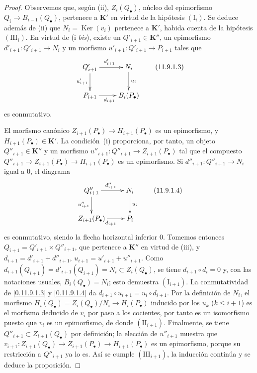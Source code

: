 \begin{proof}
Observemos que, según (ii), $Z_i(Q_\bullet)$, núcleo del epimorfismo $Q_i\to B_{i-1}(Q_\bullet)$, pertenece a $\boldsymbol{K}'$ en virtud de la hipótesis $(\mathrm I_i)$. Se deduce además de (ii) que
$N_i=\operatorname{Ker}(v_i)$
pertenece a $\boldsymbol{K}'$, habida cuenta de la hipótesis $(\mathrm{III}_i)$. En virtud de (i \emph{bis}), existe un $Q'_{i+1}\in\boldsymbol{K}''$, un epimorfismo
$d'_{i+1}:Q'_{i+1}\to N_i$
y un morfismo $u'_{i+1}:Q'_{i+1}\to P_{i+1}$ tales que
\[
\xymatrix{
Q'_{i+1}\ar[r]^{d'_{i+1}}\ar[d]_{u'_{i+1}} &
N_i\ar[d]^{u_i}\\
P_{i+1}\ar[r]_{d_{i+1}} & B_i(P_\bullet)
}
\tag{11.9.1.3}\label{0.11.9.1.3-fr}
\]
es conmutativo.

El morfismo canónico
$Z_{i+1}(P_\bullet)\to H_{i+1}(P_\bullet)$
es un epimorfismo, y $H_{i+1}(P_\bullet)\in\boldsymbol{K}'$.
La condición~(i) proporciona, por tanto, un objeto $Q''_{i+1}\in\boldsymbol{K}''$ y un
morfismo
$u''_{i+1}:Q''_{i+1}\to Z_{i+1}(P_\bullet)$
tal que el compuesto
$Q''_{i+1}\to Z_{i+1}(P_\bullet)\to H_{i+1}(P_\bullet)$
es un epimorfismo.
Si $d''_{i+1}:Q''_{i+1}\to N_i$ igual a $0$, el diagrama
\[
\xymatrix{
Q''_{i+1}\ar[r]^{d''_{i+1}}\ar[d]_{u''_{i+1}} &
N_i\ar[d]^{u_i}\\
Z_{i+1}(P_\bullet)\ar[r]_{d_{i+1}} & P_i
}
\tag{11.9.1.4}\label{0.11.9.1.4-fr}
\]
es conmutativo, siendo la flecha horizontal inferior $0$. Tomemos entonces $Q_{i+1}=Q'_{i+1}\times Q''_{i+1}$, que pertenece a $\boldsymbol{K}''$ en virtud de (iii), y
$d_{i+1}=d'_{i+1}+d''_{i+1}$, $u_{i+1}=u'_{i+1}+u''_{i+1}$.
Como $d_{i+1}(Q_{i+1})=d'_{i+1}(Q_{i+1})=N_i\subset Z_i(Q_\bullet)$, se tiene
$d_{i+1}\circ d_i=0$ y, con las notaciones usuales,
$B_i(Q_\bullet)=N_i$; esto demuestra
$(\mathrm I_{i+1})$.
La conmutatividad de \eqref{0.11.9.1.3} y
\eqref{0.11.9.1.4} da
$d_{i+1}\circ u_{i+1}=u_i\circ d_{i+1}$.
Por la definición de $N_i$, el morfismo
$H_i(Q_\bullet)=Z_i(Q_\bullet)/N_i\to H_i(P_\bullet)$
inducido por los $u_k$ ($k\leq i+1$) es el morfismo deducido de $v_i$ por paso a los cocientes, por tanto es un isomorfismo puesto que $v_i$ es un epimorfismo, de donde $(\mathrm{II}_{i+1})$. Finalmente, se tiene $Q''_{i+1}\subset Z_{i+1}(Q_\bullet)$ por definición; la elección de $u''_{i+1}$ muestra que
$v_{i+1}:Z_{i+1}(Q_\bullet)\to Z_{i+1}(P_\bullet)
\to H_{i+1}(P_\bullet)$
es un epimorfismo, porque su restricción a $Q''_{i+1}$ ya lo
es.
Así se cumple $(\mathrm{III}_{i+1})$, la inducción continúa y se deduce la
proposición.
\end{proof}

